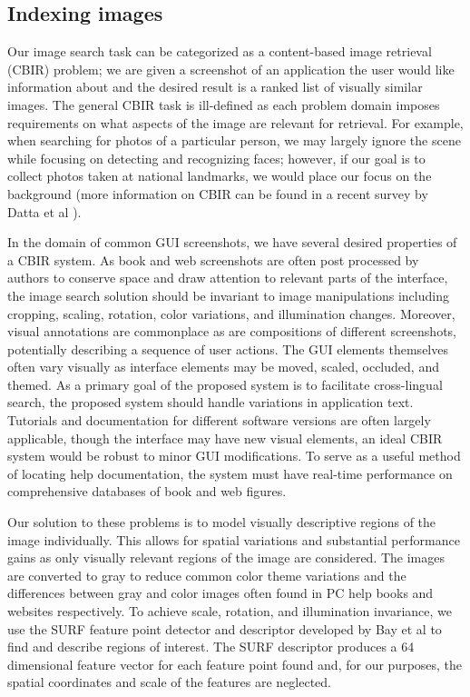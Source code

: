 \documentclass{www2010-submission}
\begin{document}
\subsection{Indexing images}
\label{sec:indexing_images}

Our image search task can be categorized as a content-based image
retrieval (CBIR) problem; we are given a screenshot of an application
the user would like information about and the desired result is a
ranked list of visually similar images.  The general CBIR task is
ill-defined as each problem domain imposes requirements on what
aspects of the image are relevant for retrieval.  For example, when
searching for photos of a particular person, we may largely ignore the
scene while focusing on detecting and recognizing faces; however, if
our goal is to collect photos taken at national landmarks, we
would place our focus on the background (more information on
CBIR can be found in a recent survey by Datta et al \cite{Datta1348248}).

In the domain of common GUI screenshots, we have several desired
properties of a CBIR system.  As book and web screenshots are often
post processed by authors to conserve space and draw attention to
relevant parts of the interface, the image search solution should be
invariant to image manipulations including cropping, scaling,
rotation, color variations, and illumination changes.  Moreover,
visual annotations are commonplace as are compositions of different
screenshots, potentially describing a sequence of user actions.  The
GUI elements themselves often vary visually as interface elements may
be moved, scaled, occluded, and themed.  As a primary goal of the
proposed system is to facilitate cross-lingual search, the proposed
system should handle variations in application text.  Tutorials and
documentation for different software versions are often largely
applicable, though the interface may have new visual elements, an
ideal CBIR system would be robust to minor GUI modifications.  To
serve as a useful method of locating help documentation, the system
must have real-time performance on comprehensive databases of book and
web figures.

Our solution to these problems is to model visually descriptive
regions of the image individually.  This allows for spatial variations
and substantial performance gains as only visually relevant regions
of the image are considered.  The images are converted to gray to
reduce common color theme variations and the differences between gray
and color images often found in PC help books and websites
respectively.  To achieve scale, rotation, and illumination
invariance, we use the SURF feature point detector and descriptor
developed by Bay et al \cite{VanGool1370556} to find and describe regions of interest.  The
SURF descriptor produces a 64 dimensional feature vector for each
feature point found and, for our purposes, the spatial coordinates and
scale of the features are neglected.
\end{document}
